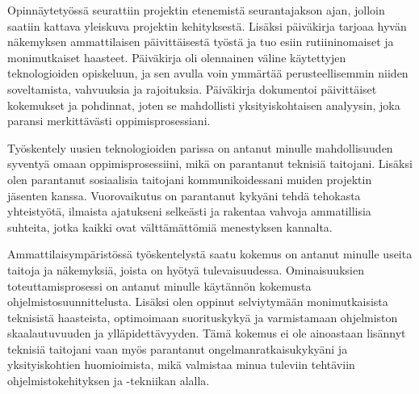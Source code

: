 \documentclass[11pt,a4paper,titlepage,oneside]{article}
\begin{document}

%




Opinnäytetyössä seurattiin projektin etenemistä seurantajakson ajan,
jolloin saatiin kattava yleiskuva projektin kehityksestä.
Lisäksi päiväkirja tarjoaa hyvän näkemyksen ammattilaisen päivittäisestä työstä ja tuo esiin rutiininomaiset ja monimutkaiset haasteet. 
Päiväkirja oli olennainen väline käytettyjen teknologioiden opiskeluun,
ja sen avulla voin ymmärtää perusteellisemmin niiden soveltamista, vahvuuksia ja rajoituksia. 
Päiväkirja dokumentoi päivittäiset kokemukset ja pohdinnat,
joten se mahdollisti yksityiskohtaisen analyysin, joka paransi merkittävästi oppimisprosessiani.
\medskip





Työskentely uusien teknologioiden parissa on antanut minulle mahdollisuuden syventyä omaan oppimisprosessiini, 
mikä on parantanut teknisiä taitojani.
Lisäksi olen parantanut sosiaalisia taitojani kommunikoidessani muiden projektin jäsenten kanssa.
Vuorovaikutus on parantanut kykyäni tehdä tehokasta yhteistyötä,
ilmaista ajatukseni selkeästi ja rakentaa vahvoja ammatillisia suhteita,
jotka kaikki ovat välttämättömiä menestyksen kannalta. \\
\medskip



Ammattilaisympäristössä työskentelystä saatu kokemus on antanut minulle useita taitoja ja näkemyksiä, 
joista on hyötyä tulevaisuudessa.
Ominaisuuksien toteuttamisprosessi on antanut minulle käytännön kokemusta ohjelmistosuunnittelusta. 
Lisäksi olen oppinut selviytymään monimutkaisista teknisistä haasteista,
optimoimaan suorituskykyä ja varmistamaan ohjelmiston skaalautuvuuden ja ylläpidettävyyden.
Tämä kokemus ei ole ainoastaan lisännyt teknisiä taitojani vaan myös parantanut ongelmanratkaisukykyäni ja yksityiskohtien huomioimista, 
mikä valmistaa minua tuleviin tehtäviin ohjelmistokehityksen ja -tekniikan alalla.

\medskip



\end{document}
